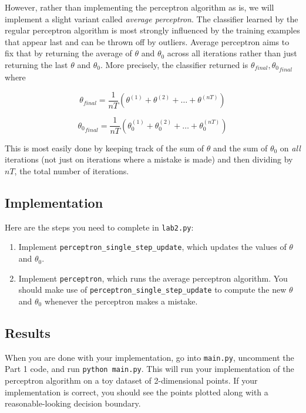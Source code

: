 \documentclass{article}
\begin{document}
However, rather than implementing the perceptron algorithm as is, we will implement a slight variant called \textit{average perceptron}. The classifier learned by the regular perceptron algorithm is most strongly influenced by the training examples that appear last and can be thrown off by outliers. Average perceptron aims to fix that by returning the average of $\theta$ and $\theta_0$ across all iterations rather than just returning the last $\theta$ and $\theta_0$. More precisely, the classifier returned is $\theta_{final}, {\theta_0}_{final}$ where

$$\theta_{final} = \frac{1}{nT} \left( \theta^{(1)} + \theta^{(2)} + \dots + \theta^{(nT)} \right)$$

$${\theta_0}_{final} = \frac{1}{nT} \left( \theta_0^{(1)} + \theta_0^{(2)} + \dots + \theta_0^{(nT)} \right)$$

This is most easily done by keeping track of the sum of $\theta$ and the sum of $\theta_0$ on \textit{all} iterations (not just on iterations where a mistake is made) and then dividing by $nT$, the total number of iterations.

\subsection{Implementation}

Here are the steps you need to complete in \texttt{lab2.py}:

\begin{enumerate}
\item Implement \texttt{perceptron\_single\_step\_update}, which updates the values of $\theta$ and $\theta_0$.
\item Implement \texttt{perceptron}, which runs the average perceptron algorithm. You should make use of \texttt{perceptron\_single\_step\_update} to compute the new $\theta$ and $\theta_0$ whenever the perceptron makes a mistake.
\end{enumerate}

\subsection{Results}

When you are done with your implementation, go into \texttt{main.py}, uncomment the Part 1 code, and run \texttt{python main.py}. This will run your implementation of the perceptron algorithm on a toy dataset of 2-dimensional points. If your implementation is correct, you should see the points plotted along with a reasonable-looking decision boundary.
\end{document}
